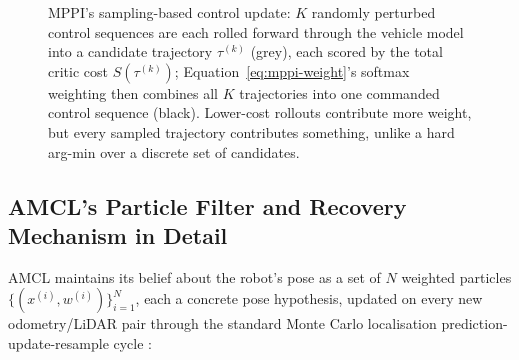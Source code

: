 \begin{figure}[htbp]
  \centering
  \caption[MPPI's sampling-based control update]{MPPI's sampling-based control update: $K$ randomly perturbed control sequences are each rolled forward through the vehicle model into a candidate trajectory $\tau^{(k)}$ (grey), each scored by the total critic cost $S(\tau^{(k)})$; Equation~\ref{eq:mppi-weight}'s softmax weighting then combines all $K$ trajectories into one commanded control sequence (black). Lower-cost rollouts contribute more weight, but every sampled trajectory contributes something, unlike a hard arg-min over a discrete set of candidates.}
  \label{fig:mppi-concept}
\end{figure}

\subsection{AMCL's Particle Filter and Recovery Mechanism in Detail}
\label{sec:amcl-math}

AMCL maintains its belief about the robot's pose as a set of $N$
weighted particles $\{(x^{(i)}, w^{(i)})\}_{i=1}^{N}$, each a
concrete pose hypothesis, updated on every new odometry/LiDAR pair
through the standard Monte Carlo localisation prediction-update-resample
cycle \cite{thrun2000probrob}:

